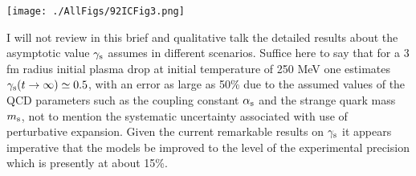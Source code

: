 \begin{mdframed}[linecolor=gray,roundcorner=12pt,backgroundcolor=Dandelion!15,linewidth=1pt,leftmargin=0cm,rightmargin=0cm,topline=true,bottomline=true,skipabove=12pt]
\centerline{\texttt{[image: ./AllFigs/92ICFig3.png]}}
{}


I will not review in this brief and qualitative talk the detailed results
about the asymptotic value $\gamma_{\rm s}$ assumes in different
scenarios. Suffice here to say that for a $3$ fm radius initial plasma
drop at initial temperature of 250 MeV one estimates $\gamma_{\rm
s}(t\to\infty)\simeq0.5$, with an error as large as 50\% due to the
assumed values of the QCD parameters such as the coupling constant
$\alpha_{\rm s}$ and the strange quark mass $m_{\rm s}$, not to mention
the systematic uncertainty associated with use of perturbative expansion.
Given the current remarkable results on $\gamma_{\rm s}$ it appears
imperative that the models be improved to the level of the experimental
precision which is presently at about 15\%.


\end{mdframed}
